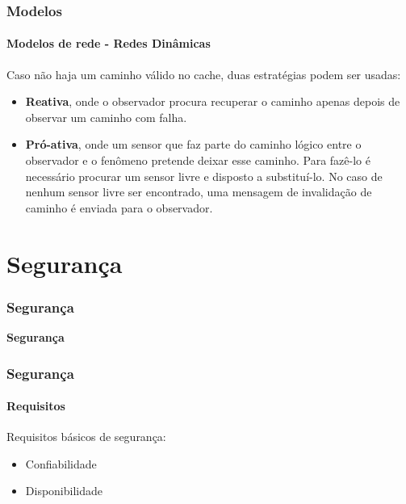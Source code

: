\documentclass[notes]{beamer}
\begin{document}
\begin{frame}
\label{slide_61}
\frametitle{Modelos}
\framesubtitle{Modelos de rede - Redes Dinâmicas}

\begin{block}

Caso não haja um caminho válido no cache, duas estratégias podem ser usadas: \pause

\begin{itemize}

\item \textbf{Reativa}, onde o observador procura recuperar o caminho apenas depois de observar um caminho com falha. \pause

\item \textbf{Pró-ativa}, onde um sensor que faz parte do caminho lógico entre o observador e o fenômeno pretende deixar esse caminho. Para fazê-lo é necessário procurar um sensor livre e disposto a substituí-lo. No caso de nenhum sensor livre ser encontrado, uma mensagem de invalidação de caminho é enviada para o observador. 

\end{itemize}

\end{block}

\end{frame}

\section{Segurança}

\begin{frame}
\label{slide_62}
\frametitle{Segurança}

\begin{block}

 \center \textbf{Segurança}

\end{block}

\end{frame}

\begin{frame}
\label{slide_63}
\frametitle{Segurança}
\framesubtitle{Requisitos}

\begin{block}

Requisitos básicos de segurança: \pause

\begin{itemize}

\item Confiabilidade \pause
\item Disponibilidade

\end{itemize}

\end{block} 

\end{frame}
\end{document}
